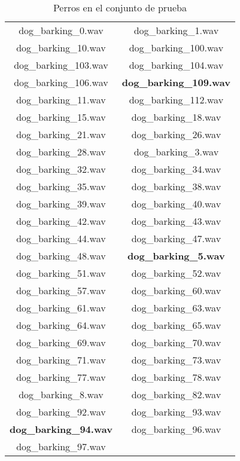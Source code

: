 \documentclass[twocolumn,10pt]{asme2ej}
\begin{document}
\begin{table}[h]
\begin{tabular}{cc}
dog\_barking\_0.wav & dog\_barking\_1.wav \\
dog\_barking\_10.wav & dog\_barking\_100.wav \\
dog\_barking\_103.wav & dog\_barking\_104.wav \\
dog\_barking\_106.wav & \textbf{dog\_barking\_109.wav} \\
dog\_barking\_11.wav & dog\_barking\_112.wav \\
dog\_barking\_15.wav & dog\_barking\_18.wav \\
dog\_barking\_21.wav & dog\_barking\_26.wav \\
dog\_barking\_28.wav & dog\_barking\_3.wav \\
dog\_barking\_32.wav & dog\_barking\_34.wav \\
dog\_barking\_35.wav & dog\_barking\_38.wav \\
dog\_barking\_39.wav & dog\_barking\_40.wav \\
dog\_barking\_42.wav & dog\_barking\_43.wav \\
dog\_barking\_44.wav & dog\_barking\_47.wav \\
dog\_barking\_48.wav& \textbf{dog\_barking\_5.wav}\\
dog\_barking\_51.wav& dog\_barking\_52.wav\\
dog\_barking\_57.wav& dog\_barking\_60.wav\\
dog\_barking\_61.wav& dog\_barking\_63.wav\\
dog\_barking\_64.wav& dog\_barking\_65.wav\\
dog\_barking\_69.wav& dog\_barking\_70.wav\\
dog\_barking\_71.wav& dog\_barking\_73.wav\\
dog\_barking\_77.wav& dog\_barking\_78.wav\\
dog\_barking\_8.wav& dog\_barking\_82.wav\\
dog\_barking\_92.wav& dog\_barking\_93.wav\\
\textbf{dog\_barking\_94.wav}& dog\_barking\_96.wav\\
dog\_barking\_97.wav
\end{tabular}
\caption{Perros en el conjunto de prueba}
\label{tbl:conjunto_prueba_perro}
\end{table}
\end{document}
